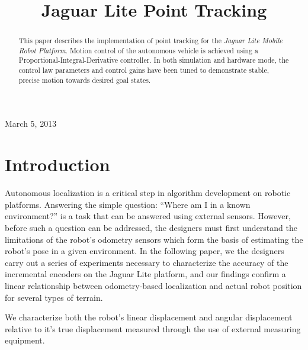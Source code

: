 \documentclass[conference]{IEEEtran}
\begin{document}
%
\title{Jaguar Lite Point Tracking}

\author{
\and
{}
}

\maketitle
{\flushleft March 5, 2013}\\
\IEEEpeerreviewmaketitle

\begin{abstract}
This paper describes the implementation of point tracking for the \emph{Jaguar Lite Mobile Robot Platform}. Motion control of the autonomous vehicle is achieved using a Proportional-Integral-Derivative controller. In both simulation and hardware mode, the control law parameters and control gains have been tuned to demonstrate stable, precise motion towards desired goal states.
\end{abstract} 

\section{Introduction}
Autonomous localization is a critical step in algorithm development on robotic platforms.  Answering the simple question: ``Where am I in
a known environment?'' is a task that can be answered using external sensors.
However, before such a question can be addressed, the designers must first
understand the limitations of the robot's odometry sensors which form the basis
 of estimating the robot's pose in a given environment. In the following paper, 
we the designers carry out a series of experiments necessary to characterize 
the accuracy of the incremental encoders on the Jaguar Lite platform, and our findings confirm a linear relationship between 
odometry-based localization and actual robot position for several types of terrain. 

We characterize both the robot's linear displacement and angular 
displacement relative to it's true displacement measured through the use of 
external measuring equipment.
\end{document}
